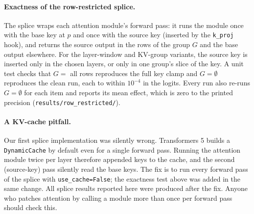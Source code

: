 \paragraph{Exactness of the row-restricted splice.} The splice wraps each attention module's forward pass: it runs the module once with the base key at $p$ and once with the source key (inserted by the \texttt{k\_proj} hook), and returns the source output in the rows of the group $G$ and the base output elsewhere. For the layer-window and KV-group variants, the source key is inserted only in the chosen layers, or only in one group's slice of the key. A unit test checks that $G = $ all rows reproduces the full key clamp and $G = \emptyset$ reproduces the clean run, each to within $10^{-4}$ in the logits. Every run also re-runs $G = \emptyset$ for each item and reports its mean effect, which is zero to the printed precision (\texttt{results/row\_restricted/}).

\paragraph{A KV-cache pitfall.} Our first splice implementation was silently wrong. Transformers 5 builds a \texttt{DynamicCache} by default even for a single forward pass. Running the attention module twice per layer therefore appended keys to the cache, and the second (source-key) pass silently read the base keys. The fix is to run every forward pass of the splice with \texttt{use\_cache=False}; the exactness test above was added in the same change. All splice results reported here were produced after the fix. Anyone who patches attention by calling a module more than once per forward pass should check this.

